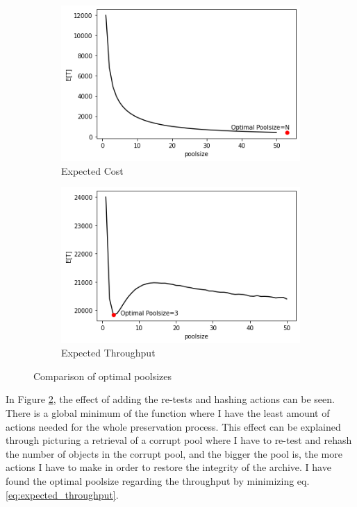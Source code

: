 \begin{figure}[h]%
    \centering
    \begin{subfigure}{6cm}
    \includegraphics[width=\linewidth]{graphics/expected_cost.png}
    \caption{Expected Cost}\label{fig:expeted_cost}
    \end{subfigure}
    \qquad
    \begin{subfigure}{6cm}
    \includegraphics[width=\linewidth]{graphics/expected_throughput.png}
    \caption{Expected Throughput}\label{fig:expected_throughput}
    \end{subfigure}
    \caption{Comparison of optimal poolsizes}%
    \label{fig:optimal_pool_size}%
\end{figure}

In Figure \ref{fig:expected_throughput}, the effect of adding the re-tests and hashing actions can be seen. There is a global minimum of the function where I have the least amount of actions needed for the whole preservation process. This effect can be explained through picturing a retrieval of a corrupt pool where I have to re-test and rehash the number of objects in the corrupt pool, and the bigger the pool is, the more actions I have to make in order to restore the integrity of the archive. I have found the optimal poolsize regarding the throughput by minimizing eq. \ref{eq:expected_throughput}. 

